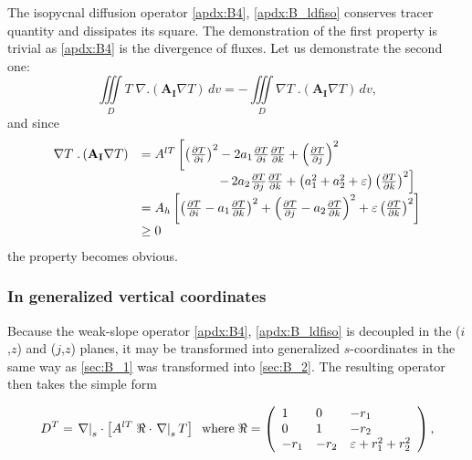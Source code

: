 \documentclass[../main/NEMO_manual]{subfiles}
\begin{document}
The isopycnal diffusion operator \autoref{apdx:B4},
\autoref{apdx:B_ldfiso} conserves tracer quantity and dissipates its square.
The demonstration of the first property is trivial as \autoref{apdx:B4} is the divergence of fluxes.
Let us demonstrate the second one:
\[
  \iiint\limits_D T\;\nabla .\left( {\textbf{A}}_{\textbf{I}} \nabla T \right)\,dv
  = -\iiint\limits_D \nabla T\;.\left( {\textbf{A}}_{\textbf{I}} \nabla T \right)\,dv,
\]
and since
\begin{align*}
  {
  \begin{array}{*{20}l}
    \nabla T\;.\left( {{\rm {\bf A}}_{\rm {\bf I}} \nabla T}
    \right)&=A^{lT}\left[ {\left( {\frac{\partial T}{\partial i}} \right)^2-2a_1
             \frac{\partial T}{\partial i}\frac{\partial T}{\partial k}+\left(
             {\frac{\partial T}{\partial j}} \right)^2} \right. \\
           &\qquad \qquad \qquad
             { \left. -\,{2a_2 \frac{\partial T}{\partial j}\frac{\partial T}{\partial k}+\left( {a_1 ^2+a_2 ^2+\varepsilon} \right)\left( {\frac{\partial T}{\partial k}} \right)^2} \right]} \\
           &=A_h \left[ {\left( {\frac{\partial T}{\partial i}-a_1 \frac{\partial
             T}{\partial k}} \right)^2+\left( {\frac{\partial T}{\partial
             j}-a_2 \frac{\partial T}{\partial k}} \right)^2}
             +\varepsilon \left(\frac{\partial T}{\partial k}\right) ^2\right]      \\
           & \geq 0
  \end{array}
             }
\end{align*}
the property becomes obvious.

\subsubsection*{In generalized vertical coordinates}

Because the weak-slope operator \autoref{apdx:B4},
\autoref{apdx:B_ldfiso} is decoupled in the ($i$,$z$) and ($j$,$z$) planes,
it may be transformed into generalized $s$-coordinates in the same way as
\autoref{sec:B_1} was transformed into \autoref{sec:B_2}.
The resulting operator then takes the simple form

\begin{equation}
  \label{apdx:B_ldfiso_s}
  D^T = \left. \nabla \right|_s \cdot
  \left[ A^{lT} \;\Re \cdot \left. \nabla \right|_s T  \right] \\
  \;\;\text{where} \;\Re =\left( {{
        \begin{array}{*{20}c}
          1 \hfill & 0 \hfill & {-r _1 } \hfill \\
          0 \hfill & 1 \hfill & {-r _2 } \hfill \\
          {-r _1 } \hfill & {-r _2 } \hfill & {\varepsilon +r _1
                                              ^2+r _2 ^2} \hfill \\
        \end{array}
      }} \right),
\end{equation}
\end{document}
